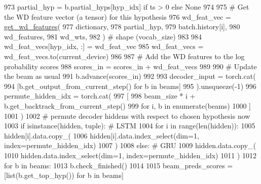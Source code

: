 \begin{DoxyCode}
973                             partial\_hyp = b.partial\_hyps[hyp\_idx] \textcolor{keywordflow}{if} ts > 0 \textcolor{keywordflow}{else} \textcolor{keywordtype}{None}
974 
975                             \textcolor{comment}{# Get the WD feature vector (a tensor) for this hypothesis}
976                             wd\_feat\_vec = \hyperlink{namespaceprojects_1_1controllable__dialogue_1_1controllable__seq2seq_1_1controls_a0324491b8ecb07aaf415e47d6575cbac}{get\_wd\_features}(
977                                 dictionary,
978                                 partial\_hyp,
979                                 batch.history[i],
980                                 wd\_features,
981                                 wd\_wts,
982                             )  \textcolor{comment}{# shape (vocab\_size)}
983 
984                             wd\_feat\_vecs[hyp\_idx, :] = wd\_feat\_vec
985                         wd\_feat\_vecs = wd\_feat\_vecs.to(current\_device)
986 
987                         \textcolor{comment}{# Add the WD features to the log probability scores}
988                         scores\_in = scores\_in + wd\_feat\_vecs
989 
990                     \textcolor{comment}{# Update the beam as usual}
991                     b.advance(scores\_in)
992 
993             decoder\_input = torch.cat(
994                 [b.get\_output\_from\_current\_step() \textcolor{keywordflow}{for} b \textcolor{keywordflow}{in} beams]
995             ).unsqueeze(-1)
996             permute\_hidden\_idx = torch.cat(
997                 [
998                     beam\_size * i + b.get\_backtrack\_from\_current\_step()
999                     \textcolor{keywordflow}{for} i, b \textcolor{keywordflow}{in} enumerate(beams)
1000                 ]
1001             )
1002             \textcolor{comment}{# permute decoder hiddens with respect to chosen hypothesis now}
1003             \textcolor{keywordflow}{if} isinstance(hidden, tuple):  \textcolor{comment}{# LSTM}
1004                 \textcolor{keywordflow}{for} i \textcolor{keywordflow}{in} range(len(hidden)):
1005                     hidden[i].data.copy\_(
1006                         hidden[i].data.index\_select(dim=1, index=permute\_hidden\_idx)
1007                     )
1008             \textcolor{keywordflow}{else}:  \textcolor{comment}{# GRU}
1009                 hidden.data.copy\_(
1010                     hidden.data.index\_select(dim=1, index=permute\_hidden\_idx)
1011                 )
1012         \textcolor{keywordflow}{for} b \textcolor{keywordflow}{in} beams:
1013             b.check\_finished()
1014 
1015         beam\_preds\_scores = [list(b.get\_top\_hyp()) \textcolor{keywordflow}{for} b \textcolor{keywordflow}{in} beams]

\end{DoxyCode}
